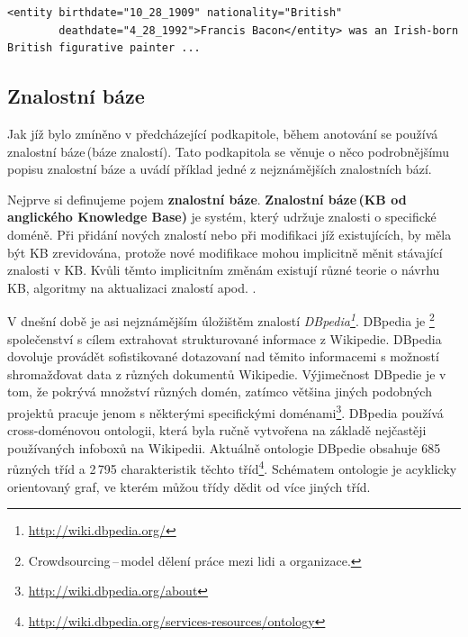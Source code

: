 \begin{lstlisting}[label=ontologicalAnnotationExample, caption={Ontologická neboli strukturovaná anotace}, captionpos=b]
<entity birthdate="10_28_1909" nationality="British"
        deathdate="4_28_1992">Francis Bacon</entity> was an Irish-born 
British figurative painter ...
\end{lstlisting}

\subsection{Znalostní báze}
Jak jíž bylo zmíněno v předcházející podkapitole, během anotování se používá znalostní báze\,(báze znalostí). Tato podkapitola se věnuje o něco podrobnějšímu popisu znalostní báze a uvádí příklad jedné z nejznámějších znalostních bází.

Nejprve si definujeme pojem \textbf{znalostní báze}. \textbf{Znalostní báze\,(KB od anglického Knowledge Base)} je systém, který udržuje znalosti o specifické doméně. Při přidání nových znalostí nebo při modifikaci jíž existujících, by měla být KB zrevidována, protože nové modifikace mohou implicitně měnit stávající znalosti v KB. Kvůli těmto implicitním změnám existují různé teorie o návrhu KB, algoritmy na aktualizaci znalostí apod. \cite{dalal1988investigations}.

V dnešní době je asi nejznámějším úložištěm znalostí  \emph{DBpedia\footnote{\href{http://wiki.dbpedia.org/}{http://wiki.dbpedia.org/}}}. DBpedia je \footnote{Crowdsourcing\,--\,model dělení práce mezi lidi a organizace.} společenství s cílem extrahovat strukturované informace z Wikipedie. DBpedia dovoluje provádět sofistikované dotazovaní nad těmito informacemi s možností shromažďovat data z různých dokumentů Wikipedie. Výjimečnost DBpedie je v tom, že pokrývá množství různých domén, zatímco většina jiných podobných projektů pracuje jenom s některými specifickými doménami\footnote{\href{http://wiki.dbpedia.org/about}{http://wiki.dbpedia.org/about}}.  DBpedia používá cross-doménovou ontologii, která byla ručně vytvořena na základě nejčastěji používaných infoboxů na Wikipedii. Aktuálně ontologie DBpedie obsahuje 685 různých tříd a 2\,795 charakteristik těchto tříd\footnote{\href{http://wiki.dbpedia.org/services-resources/ontology}{http://wiki.dbpedia.org/services-resources/ontology}}. Schématem ontologie je acyklicky orientovaný graf, ve kterém můžou třídy dědit od více jiných tříd. 



